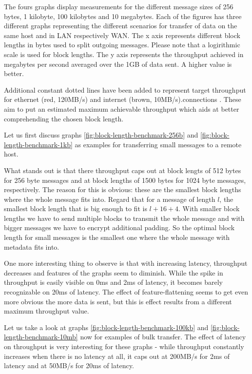 The fours graphs display measurements for the different message sizes of 256 bytes, 1 kilobyte, 100 kilobytes and 10 megabytes.
Each of the figures has three different graphs representing the different scenarios for transfer of data on the same host and in LAN respectively WAN.
The x axis represents different block lengths in bytes used to split outgoing messages.
Please note that a logirithmic scale is used for block lengths.
The y axis represents the throughput achieved in megabytes per second averaged over the 1GB of data sent.
A higher value is better.

Additional constant dotted lines have been added to represent target throughput for ethernet (red, 120MB/s) and internet (brown, 10MB/s).connections .
These aim to put an estimated maximum achievable throughput which aids at better comprehending the chosen block length.

\medskip

Let us first discuss graphs \ref{fig:block-length-benchmark-256b} and \ref{fig:block-length-benchmark-1kb} as examples for transferring small messages to a remote host.

What stands out is that there throughput caps out at block lengts of 512 bytes for 256 byte messages and at block lengths of 1500 bytes for 1024 byte messages, respectively.
The reason for this is obvious: these are the smallest block lengths where the whole message fits into.
Regard that for a message of length $l$, the smallest block length that is big enough to fit is $l + 16 + 4$.
With smaller block lengths we have to send multiple blocks to transmit the whole message and with bigger messages we have to encrypt additional padding.
So the optimal block length for small messages is the smallest one where the whole message with metadata fits into.

One more interesting thing to observe is that with increasing latency, throughput decreases and features of the graphs seem to diminish.
While the spike in throughput is easily visible on 0ms and 2ms of latency, it becomes barely recognizable on 20ms of latency.
The effect of feature-flattening seems to get even more obvious the more data is sent, but this is effect results from a different maximum throughput value.

Let us take a look at graphs \ref{fig:block-length-benchmark-100kb} and \ref{fig:block-length-benchmark-10mb} now for examples of bulk transfer.
The effect of latency on throughput is very interesting for these graphs - while throughput constantly increases when there is no latency at all, it caps out at 200MB/s for 2ms of latency and at 50MB/s for 20ms of latency.

